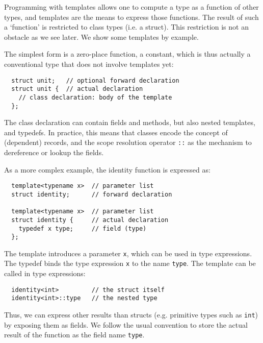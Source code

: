 \documentclass{llncs}
\begin{document}
  Programming with templates allows one to compute a type as a function
  of other types, and templates are the means to express those functions.
  The result of such a `function' is restricted to class
  types (i.e. a struct). This restriction is not an obstacle as we see
  later. We show some templates by example.

  The simplest form is a zero-place function, a constant, which
  is thus actually a conventional type that does not involve
  templates yet:
  \begin{lstlisting}
  struct unit;   // optional forward declaration
  struct unit {  // actual declaration
    // class declaration: body of the template
  };
  \end{lstlisting}
  The class declaration can contain fields and methods, but also
  nested templates, and typedefs. In practice, this means that
  classes encode the concept of (dependent) records, and the
  scope resolution operator \lstinline$::$ as the mechanism
  to dereference or lookup the fields.

  As a more complex example, the identity function is expressed as:
  \begin{lstlisting}
  template<typename x>  // parameter list
  struct identity;      // forward declaration

  template<typename x>  // parameter list
  struct identity {     // actual declaration
    typedef x type;     // field (type)
  };
  \end{lstlisting}
  The template introduces a parameter \lstinline$x$, which can
  be used in type expressions. The typedef binds the type
  expression \lstinline$x$ to the name \lstinline$type$.
  The template can be called in type expressions:
  \begin{lstlisting}
  identity<int>         // the struct itself
  identity<int>::type   // the nested type
  \end{lstlisting}
  Thus, we can express other results than structs (e.g. primitive
  types such as \lstinline$int$) by exposing them as fields.
  We follow the usual convention to store the actual result of the
  function as the field name \lstinline$type$.
\end{document}
